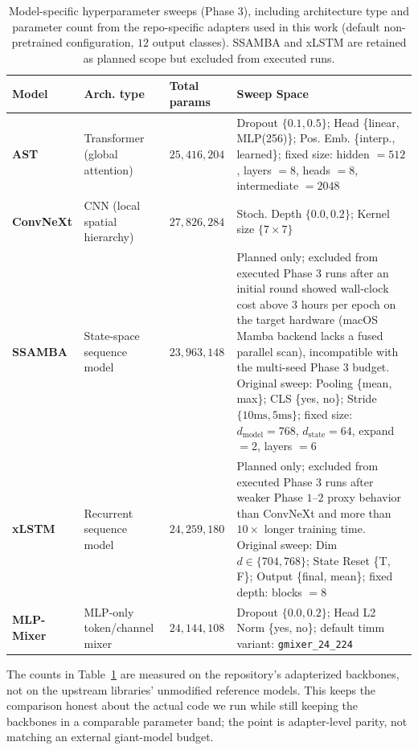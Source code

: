 \documentclass[cameraready]{Interspeech}
\begin{document}
\begin{table}[h]
\centering
\caption{Model-specific hyperparameter sweeps (Phase $3$), including architecture type and parameter count from the repo-specific adapters used in this work (default non-pretrained configuration, $12$ output classes). SSAMBA and xLSTM are retained as planned scope but excluded from executed runs.}
\label{tab:model_hyperparams}
\small
\begin{tabular}{@{}p{1.8cm} p{4.1cm} p{1.8cm} p{8.0cm}@{}}
\toprule
\textbf{Model} & \textbf{Arch. type} & \textbf{Total params} & \textbf{Sweep Space} \\ \midrule
\textbf{AST} & Transformer (global attention) & $25{,}416{,}204$ & Dropout $\{0.1, 0.5\}$; Head \{linear, MLP(256)\}; Pos. Emb. \{interp., learned\}; fixed size: hidden $=512$, layers $=8$, heads $=8$, intermediate $=2048$ \cite{gong2021ast} \\
\textbf{ConvNeXt} & CNN (local spatial hierarchy) & $27{,}826{,}284$ & Stoch. Depth $\{0.0, 0.2\}$; Kernel size $\{7\times7\}$ \cite{liu2022convnet} \\
\textbf{SSAMBA} & State-space sequence model & $23{,}963{,}148$ & Planned only; excluded from executed Phase $3$ runs after an initial round showed wall-clock cost above $3$ hours per epoch on the target hardware (macOS Mamba backend lacks a fused parallel scan), incompatible with the multi-seed Phase $3$ budget. Original sweep: Pooling \{mean, max\}; CLS \{yes, no\}; Stride $\{10\text{ms}, 5\text{ms}\}$; fixed size: $d_{\text{model}}=768$, $d_{\text{state}}=64$, expand $=2$, layers $=6$ \cite{gu2023mamba,shams2024ssamba} \\
\textbf{xLSTM} & Recurrent sequence model & $24{,}259{,}180$ & Planned only; excluded from executed Phase $3$ runs after weaker Phase $1$--$2$ proxy behavior than ConvNeXt and more than $10\times$ longer training time. Original sweep: Dim $d \in \{704, 768\}$; State Reset \{T, F\}; Output \{final, mean\}; fixed depth: blocks $=8$ \cite{beck2024xlstm} \\
\textbf{MLP-Mixer} & MLP-only token/channel mixer & $24{,}144{,}108$ & Dropout $\{0.0, 0.2\}$; Head L2 Norm \{yes, no\}; default timm variant: \texttt{gmixer\_24\_224} \cite{tolstikhin2021mlpmixer} \\ \bottomrule
\end{tabular}
\end{table}

\noindent The counts in Table~\ref{tab:model_hyperparams} are measured on the repository's adapterized backbones, not on the upstream libraries' unmodified reference models. This keeps the comparison honest about the actual code we run while still keeping the backbones in a comparable parameter band; the point is adapter-level parity, not matching an external giant-model budget.
\end{document}
